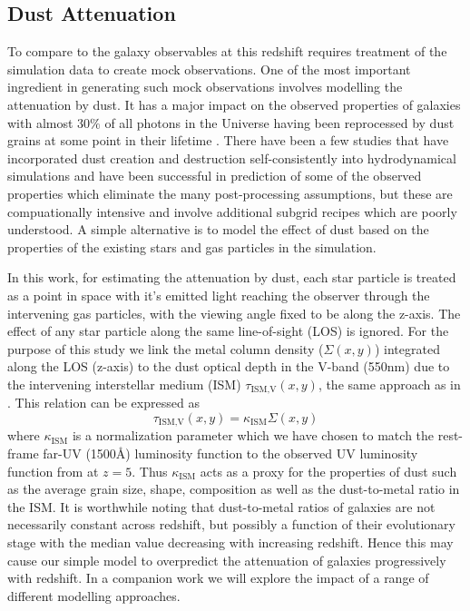 \subsection{Dust Attenuation}\label{sec:modelling.dust}
To compare to the galaxy observables at this redshift requires treatment of the simulation data to create mock observations. One of the most important ingredient in generating such mock observations involves modelling the attenuation by dust. It has a major impact on the observed properties of galaxies with almost 30$\%$ of all photons in the Universe having been reprocessed by dust grains at some point in their lifetime \citep{Bernstein2002}. There have been a few studies that have incorporated dust creation and destruction self-consistently into hydrodynamical simulations \citep[\eg][]{Aoyama2017,McKinnon2016a,Gjergo2018,dave_simba:_2019,Graziani2020} and have been successful in prediction of some of the observed properties which eliminate the many post-processing assumptions, but these are compuationally intensive and involve additional subgrid recipes which are poorly understood. A simple alternative is to model the effect of dust based on the properties of the existing stars and gas particles in the simulation.

In this work, for estimating the attenuation by dust, each star particle is treated as a point in space with it's emitted light reaching the observer through the intervening gas particles, with the viewing angle fixed to be along the z-axis. The effect of any star particle along the same line-of-sight (LOS) is ignored. For the purpose of this study we link the metal column density ($\Sigma (x,y)$) integrated along the LOS (z-axis) to the dust optical depth in the V-band (550nm) due to the intervening interstellar medium (ISM) $\tau_{\textrm{ISM,V}}(x,y)$, the same approach as in \cite{Wilkins2017}. This relation can be expressed as
\begin{equation}\label{eq: tau}
\tau_{\textrm{ISM,V}}(x,y) = \kappa_{\textrm{ISM}} \Sigma (x,y)
\end{equation} 
where $\kappa_{\textrm{ISM}}$ is a normalization parameter which we have chosen to match the rest-frame far-UV (1500\AA) luminosity function to the observed UV luminosity function from \cite{Bouwens_2015a} at $z=5$. Thus $\kappa_{\textrm{ISM}}$ acts as a proxy for the properties of dust such as the average grain size, shape, composition as well as the dust-to-metal ratio in the ISM. It is worthwhile noting that dust-to-metal ratios of galaxies are not necessarily constant across redshift, but possibly a function of their evolutionary stage \citep[see][etc]{DeVis2019,Vijayan2019} with the median value decreasing with increasing redshift. Hence this may cause our simple model to overpredict the attenuation of galaxies progressively with redshift. In a companion work we will explore the impact of a range of different modelling approaches.

